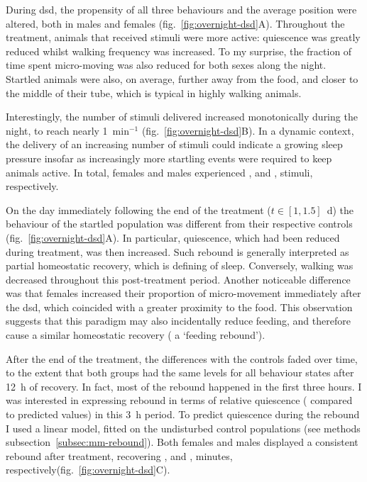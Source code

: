 

During \gls{dsd}, the propensity of all three behaviours and the average position  were altered, both in males and females (fig.~\ref{fig:overnight-dsd}A).
Throughout the treatment, animals that received stimuli were more active: quiescence was greatly reduced whilst walking frequency was increased.
To my surprise, the fraction of time spent micro-moving was also reduced for both sexes along the night.
Startled animals were also, on average, further away from the food, and closer to the middle of their tube, which is typical in highly walking animals.

Interestingly, the number of stimuli delivered increased monotonically during the night, to reach nearly 1~min$^{-1}$ (fig.~\ref{fig:overnight-dsd}B).
In a dynamic context, the delivery of an increasing number of stimuli could indicate a growing sleep pressure insofar as increasingly more startling events were required to keep animals active.
In total, females and males experienced
, and
, stimuli,
respectively.


On the day immediately following the end of the treatment ($t \in [1,1.5]$~d) the behaviour of the startled population was different from their respective controls (fig.~\ref{fig:overnight-dsd}A).
In particular, quiescence, which had been reduced during treatment, was then increased. 
Such rebound is generally interpreted as partial homeostatic recovery, which is defining of sleep.
Conversely, walking was decreased throughout this post-treatment period. 
Another noticeable difference was that females increased their proportion of micro-movement immediately after the \gls{dsd},
which coincided with a greater proximity to the food. 
This observation suggests that this paradigm may also incidentally reduce feeding, and therefore cause a similar homeostatic recovery (\ie{} a `feeding rebound').

After the end of the treatment, the differences with the controls faded over time, to the extent that both groups had the same levels for all behaviour states after 12~h of recovery.
In fact, most of the rebound happened in the first three hours. 
I was interested in expressing rebound in terms of relative quiescence (\ie{} compared to predicted values) in this 3~h period.
To predict quiescence during the rebound I used a linear model, fitted on the undisturbed control populations (see methods subsection~\ref{subsec:mm-rebound}).
Both females and males displayed a consistent rebound after treatment, recovering , and 
, 
minutes, respectively(fig.~\ref{fig:overnight-dsd}C).


